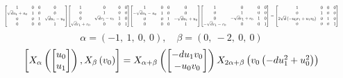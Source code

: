 \documentclass[11pt]{article}
\theoremstyle{definition}
\begin{document}
\[
\scaletoalign{\textwidth}{{\left[\begin{matrix}1 & 0 & 0 & 0\\\sqrt{d} u_{1} + u_{0} & 1 & 0 & 0\\0 & 0 & 1 & \sqrt{d} u_{1} - u_{0}\\0 & 0 & 0 & 1\end{matrix}\right]} {\left[\begin{matrix}1 & 0 & 0 & 0\\0 & 1 & 0 & 0\\0 & \sqrt{d} v_{1} - v_{0} & 1 & 0\\\sqrt{d} v_{1} + v_{0} & 0 & 0 & 1\end{matrix}\right]} {\left[\begin{matrix}1 & 0 & 0 & 0\\- \sqrt{d} u_{1} - u_{0} & 1 & 0 & 0\\0 & 0 & 1 & - \sqrt{d} u_{1} + u_{0}\\0 & 0 & 0 & 1\end{matrix}\right]} {\left[\begin{matrix}1 & 0 & 0 & 0\\0 & 1 & 0 & 0\\0 & - \sqrt{d} v_{1} + v_{0} & 1 & 0\\- \sqrt{d} v_{1} - v_{0} & 0 & 0 & 1\end{matrix}\right]} = {\left[\begin{matrix}1 & 0 & 0 & 0\\0 & 1 & 0 & 0\\2 \sqrt{d} \left(- u_{0} v_{1} + u_{1} v_{0}\right) & 0 & 1 & 0\\0 & 0 & 0 & 1\end{matrix}\right]}}
\]
\[
\alpha = \left( -1, \  1, \  0, \  0\right), \quad \beta = \left( 0, \  -2, \  0, \  0\right)
\]
\[
\scaletoalign{\textwidth}{\left[ X_{\alpha}\left(\left[\begin{matrix}u_{0}\\u_{1}\end{matrix}\right]\right), X_{\beta}\left(v_{0}\right) \right] = X_{\alpha + \beta}\left(\left[\begin{matrix}- d u_{1} v_{0}\\- u_{0} v_{0}\end{matrix}\right]\right) X_{2\alpha + \beta}\left(v_{0} \left(- d u_{1}^{2} + u_{0}^{2}\right)\right)}
\]
\end{document}
